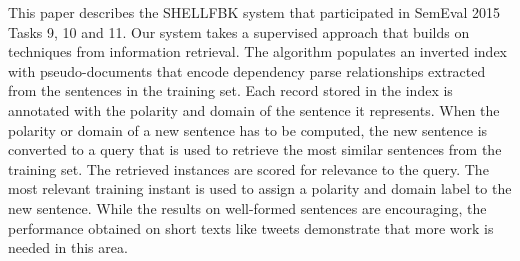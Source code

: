 This paper describes the SHELLFBK system that participated in SemEval 2015 Tasks 9, 10 and 11. Our system takes a supervised approach that builds on techniques from information retrieval. The algorithm populates an inverted index with pseudo-documents that encode dependency parse relationships extracted from the sentences in the training set. Each record stored in the index is annotated with the polarity and domain of the sentence it represents. When the polarity or domain of a new sentence has to be computed, the new sentence is converted to a query that is used to retrieve the most similar sentences from the training set. The retrieved instances are scored for relevance to the query. The most relevant training instant is used to assign a polarity and domain label to the new sentence. While the results on well-formed sentences are encouraging, the performance obtained on short texts like tweets demonstrate that more work is needed in this area.
